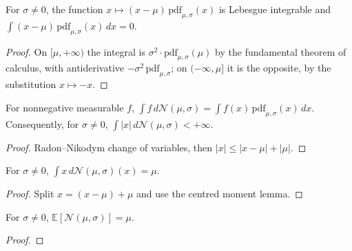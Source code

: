 \begin{lemma}\label{lem:integral_normal_centred}
  \rocqok
  For $\sigma \neq 0$, the function
  $x \mapsto (x - \mu)\,\mathrm{pdf}_{\mu,\sigma}(x)$ is Lebesgue integrable
  and $\int (x - \mu)\,\mathrm{pdf}_{\mu,\sigma}(x)\,dx = 0$.
\end{lemma}
\begin{proof}\rocqok
  On $[\mu, +\infty)$ the integral is $\sigma^2 \cdot \mathrm{pdf}_{\mu,\sigma}(\mu)$
  by the fundamental theorem of calculus, with antiderivative
  $-\sigma^2\,\mathrm{pdf}_{\mu,\sigma}$; on $(-\infty, \mu]$ it is the
  opposite, by the substitution $x \mapsto -x$.
\end{proof}

\begin{lemma}\label{lem:normal_prob_abs_lty}
  \rocqok
  For nonnegative measurable $f$,
  $\int f\, d\mathcal{N}(\mu,\sigma) = \int f(x)\,\mathrm{pdf}_{\mu,\sigma}(x)\,dx$.
  Consequently, for $\sigma \neq 0$,
  $\int |x|\, d\mathcal{N}(\mu,\sigma) < +\infty$.
\end{lemma}
\begin{proof}\rocqok
  Radon--Nikodym change of variables, then
  $|x| \le |x - \mu| + |\mu|$.
\end{proof}

\begin{lemma}\label{lem:integral_normal_mean}
  \rocqok
  For $\sigma \neq 0$, $\int x\, d\mathcal{N}(\mu,\sigma)(x) = \mu$.
\end{lemma}
\begin{proof}\rocqok
  Split $x = (x-\mu) + \mu$ and use the centred moment lemma.
\end{proof}

\begin{lemma}\label{lem:qbs_expect_normal}
  \rocqok
  For $\sigma \neq 0$, $\mathbb{E}[\mathcal{N}(\mu, \sigma)] = \mu$.
\end{lemma}
\begin{proof}\rocqok\end{proof}


